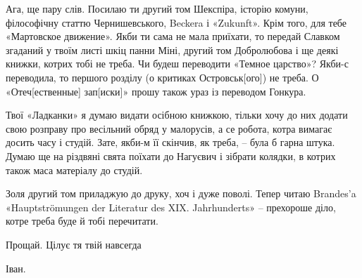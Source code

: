 Ага, ще пару слів. Посилаю ти другий том Шекспіра, історію комуни, філософічну
статтю Чернишевського, Beckera і «Zukunft». Крім того, для тебе «Мартовское
движение». Якби ти сама не мала приїхати, то передай Славком згаданий у твоїм
листі шкіц панни Міні, другий том Добролюбова і ще деякі книжки, котрих тобі не
треба. Чи будеш переводити «Темное царство»? Якби-с переводила, то першого
розділу (о критиках Островськ[ого]) не треба. О «Отеч[ественные] зап[иски]»
прошу також ураз із переводом Гонкура.

Твої «Ладканки» я думаю видати осібною книжкою, тільки хочу до них додати свою
розправу про весільний обряд у малорусів, а се робота, котра вимагає досить
часу і студій. Зате, якби-м її скінчив, як треба, – була б гарна штука. Думаю
ще на різдвяні свята поїхати до Нагуєвич і зібрати колядки, в котрих також маса
матеріалу до студій.

Золя другий том приладжую до друку, хоч і дуже поволі. Тепер читаю Brandes’a
«Hauptströmungen der Literatur des XIX. Jahrhunderts» – прехороше діло, котре
треба буде й тобі перечитати.

Прощай. Цілує тя твій навсегда

Іван. 
